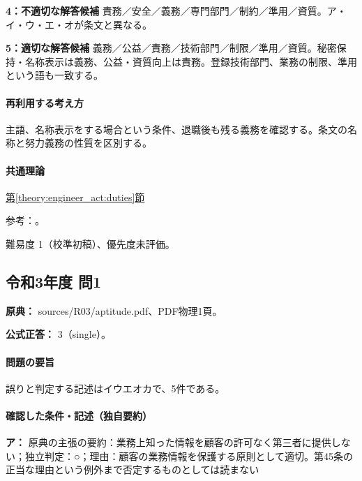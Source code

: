\noindent\textbf{4：不適切な解答候補} 責務／安全／義務／専門部門／制約／準用／資質。ア・イ・ウ・エ・オが条文と異なる。\par

\noindent\textbf{5：適切な解答候補} 義務／公益／責務／技術部門／制限／準用／資質。秘密保持・名称表示は義務、公益・資質向上は責務。登録技術部門、業務の制限、準用という語も一致する。\par

\paragraph{再利用する考え方} 主語、名称表示をする場合という条件、退職後も残る義務を確認する。条文の名称と努力義務の性質を区別する。

\paragraph{共通理論} \hyperref[theory:engineer_act:duties]{第\ref*{theory:engineer_act:duties}節}

\par 参考：\cite{engineer_act_current}。

\par 難易度 1（校準初稿）、優先度未評価。

\subsection{令和3年度 問1}
\label{q:r03-reg-apt-01}

\noindent\textbf{原典：} sources/R03/aptitude.pdf、PDF物理1頁。

\textbf{公式正答：} 3（single）。

\paragraph{問題の要旨} 誤りと判定する記述はイウエオカで、5件である。

\paragraph{確認した条件・記述（独自要約）}\mbox{}\par

\noindent\textbf{ア：} 原典の主張の要約：業務上知った情報を顧客の許可なく第三者に提供しない；独立判定：○；理由：顧客の業務情報を保護する原則として適切。第45条の正当な理由という例外まで否定するものとしては読まない\par

